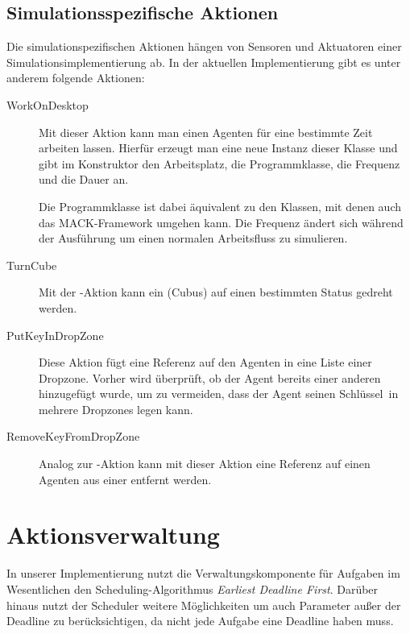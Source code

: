 \subsection{Simulationsspezifische Aktionen}
Die simulationspezifischen Aktionen hängen von Sensoren und Aktuatoren einer Simulationsimplementierung ab. In der aktuellen Implementierung gibt es unter anderem folgende Aktionen:
\begin{description}
	\item[WorkOnDesktop] Mit dieser Aktion kann man einen Agenten für eine bestimmte Zeit arbeiten lassen. Hierfür erzeugt man eine neue Instanz dieser Klasse und gibt im Konstruktor den Arbeitsplatz, die Programmklasse, die Frequenz und die Dauer an.
	
	Die Programmklasse ist dabei äquivalent zu den Klassen, mit denen auch das MACK-Framework umgehen kann. Die Frequenz ändert sich während der Ausführung um einen normalen Arbeitsfluss zu simulieren.
	\item[TurnCube] Mit der -Aktion kann ein  (Cubus) auf einen bestimmten Status gedreht werden.
	\item[PutKeyInDropZone] Diese Aktion fügt eine Referenz auf den Agenten in eine Liste einer Dropzone. Vorher wird überprüft, ob der Agent bereits einer anderen  hinzugefügt wurde, um zu vermeiden, dass der Agent seinen \glqq Schlüssel\grqq\ in mehrere Dropzones legen kann.
	\item[RemoveKeyFromDropZone] Analog zur -Aktion kann mit dieser Aktion eine Referenz auf einen Agenten aus einer  entfernt werden.
\end{description}

\section{Aktionsverwaltung}\label{subsec:real_actionhandling}
In unserer Implementierung nutzt die Verwaltungskomponente für Aufgaben im Wesentlichen den Scheduling-Algorithmus \emph{Earliest Deadline First}. Darüber hinaus nutzt der Scheduler weitere Möglichkeiten um auch Parameter außer der Deadline zu berücksichtigen, da nicht jede Aufgabe eine Deadline haben muss. 



